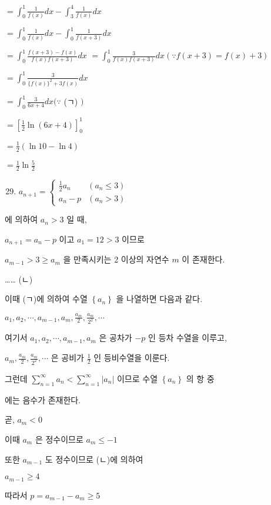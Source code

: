 \documentclass[10pt]{article}
\begin{document}
$=\int_{0}^{1} \frac{1}{f(x)} d x-\int_{3}^{4} \frac{1}{f(x)} d x$

$=\int_{0}^{1} \frac{1}{f(x)} d x-\int_{0}^{1} \frac{1}{f(x+3)} d x$

$=\int_{0}^{1} \frac{f(x+3)-f(x)}{f(x) f(x+3)} d x$ $=\int_{0}^{1} \frac{3}{f(x) f(x+3)} d x(\because f(x+3)=f(x)+3)$

$=\int_{0}^{1} \frac{3}{\{f(x)\}^{2}+3 f(x)} d x$

$=\int_{0}^{1} \frac{3}{6 x+4} d x(\because$ (ㄱ) $)$

$=\left[\frac{1}{2} \ln (6 x+4)\right]_{0}^{1}$

$=\frac{1}{2}(\ln 10-\ln 4)$

$=\frac{1}{2} \ln \frac{5}{2}$

\begin{enumerate}
  \setcounter{enumi}{28}
  \item $a_{n+1}= \begin{cases}\frac{1}{2} a_{n} & \left(a_{n} \leq 3\right) \\ a_{n}-p & \left(a_{n}>3\right)\end{cases}$
\end{enumerate}

에 의하여 $a_{n}>3$ 일 때,

$a_{n+1}=a_{n}-p$ 이고 $a_{1}=12>3$ 이므로

$a_{m-1}>3 \geq a_{m}$ 을 만족시키는 2 이상의 자연수 $m$ 이 존재한다.

…… (ㄴ)

이때 (ㄱ)에 의하여 수열 $\left\{a_{n}\right\}$ 을 나열하면 다음과 같다.

$a_{1}, a_{2}, \cdots, a_{m-1}, a_{m}, \frac{a_{m}}{2}, \frac{a_{m}}{2^{2}}, \cdots$

여기서 $a_{1}, a_{2}, \cdots, a_{m-1}, a_{m}$ 은 공차가 $-p$ 인 등차 수열을 이루고,

$a_{m}, \frac{a_{m}}{2}, \frac{a_{m}}{2^{2}}, \cdots$ 은 공비가 $\frac{1}{2}$ 인 등비수열을 이룬다.

그런데 $\sum_{n=1}^{\infty} a_{n}<\sum_{n=1}^{\infty}\left|a_{n}\right|$ 이므로 수열 $\left\{a_{n}\right\}$ 의 항 중

에는 음수가 존재한다.

곧, $a_{m}<0$

이때 $a_{m}$ 은 정수이므로 $a_{m} \leq-1$

또한 $a_{m-1}$ 도 정수이므로 (ㄴ)에 의하여

$a_{m-1} \geq 4$

따라서 $p=a_{m-1}-a_{m} \geq 5$
\end{document}
